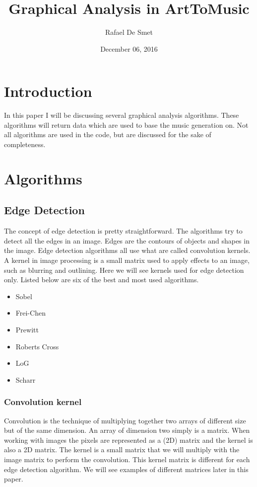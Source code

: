 \documentclass[12pt]{article}
\begin{document}
\title{Graphical Analysis in ArtToMusic}
\date{December 06, 2016}
\author{Rafael De Smet}

\maketitle
\tableofcontents
\newpage
\section{Introduction}

In this paper I will be discussing several graphical analysis algorithms. These algorithms will return data which are used to base the music generation on. Not all algorithms are used in the code, but are discussed for the sake of completeness.

\section{Algorithms}

\subsection{Edge Detection}

The concept of edge detection is pretty straightforward. The algorithms try to detect all the edges in an image. Edges are the contours of objects and shapes in the image.
Edge detection algorithms all use what are called convolution kernels. A kernel in image processing is a small matrix used to apply effects to an image, such as blurring and outlining. Here we will see kernels used for edge detection only. Listed below are six of the best and most used algorithms.

\begin{itemize}
        \item Sobel 
        \item Frei-Chen
        \item Prewitt
        \item Roberts Cross
        \item LoG
        \item Scharr
\end{itemize}

\subsubsection{Convolution kernel}

Convolution is the technique of multiplying together two arrays of different size but of the same dimension. An array of dimension two simply is a matrix. When working with images the pixels are represented as a (2D) matrix and the kernel is also a 2D matrix.
The kernel is a small matrix that we will multiply with the image matrix to perform the convolution. This kernel matrix is different for each edge detection algorithm. We will see examples of different matrices later in this paper. 
\newline
\end{document}
